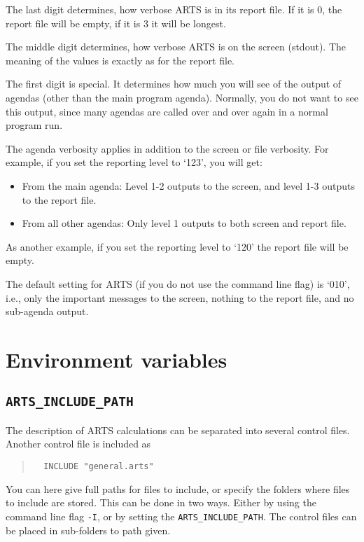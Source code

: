 The last digit determines, how verbose ARTS is in its report file. If
it is 0, the report file will be empty, if it is 3 it will be longest.

The middle digit determines, how verbose ARTS is on the screen
(stdout). The meaning of the values is exactly as for the report
file. 

The first digit is special. It determines how much you will see of the
output of agendas (other than the main program agenda). Normally, you
do not want to see this output, since many agendas are called over and
over again in a normal program run. 

The agenda verbosity applies in addition to the screen or file
verbosity. For example, if you set the reporting level to `123', you
will get: 
\begin{itemize}
\item From the main agenda: Level 1-2 outputs to the screen, and level
  1-3 outputs to the report file.
\item From all other agendas: Only level 1 outputs to both screen and
  report file.
\end{itemize}
As another example, if you set the reporting level to `120' the
report file will be empty.

The default setting for ARTS (if you do not use the command line flag)
is `010', i.e., only the important messages to the screen, nothing to
the report file, and no sub-agenda output.



\section{Environment variables}
\label{sec:concept:envvars}

\subsection*{\texttt{ARTS\_INCLUDE\_PATH}}

The description of ARTS calculations can be separated into several
control files. Another control file is included as
\begin{quote}
\begin{verbatim}
  INCLUDE "general.arts"
\end{verbatim}
\end{quote}
You can here give full paths for files to include, or specify the
folders where files to include are stored. This can be done in two
ways. Either by using the command line flag \verb|-I|, or by setting
the  \texttt{ARTS\_INCLUDE\_PATH}. The control
files can be placed in sub-folders to path given.




